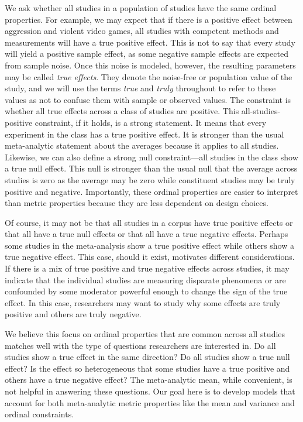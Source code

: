 \documentclass[english,man]{apa6}
\theoremstyle{definition}
\theoremstyle{definition}
\theoremstyle{remark}
\begin{document}
We ask whether all studies in a population of studies have the same
ordinal properties. For example, we may expect that if there is a
positive effect between aggression and violent video games, all studies
with competent methods and measurements will have a true positive
effect. This is not to say that every study will yield a positive sample
effect, as some negative sample effects are expected from sample noise.
Once this noise is modeled, however, the resulting parameters may be
called \emph{true effects}. They denote the noise-free or population
value of the study, and we will use the terms \emph{true} and
\emph{truly} throughout to refer to these values as not to confuse them
with sample or observed values. The constraint is whether all true
effects across a class of studies are positive. This
all-studies-positive constraint, if it holds, is a strong statement. It
means that every experiment in the class has a true positive effect. It
is stronger than the usual meta-analytic statement about the averages
because it applies to all studies. Likewise, we can also define a strong
null constraint---all studies in the class show a true null effect. This
null is stronger than the usual null that the average across studies is
zero as the average may be zero while constituent studies may be truly
positive and negative. Importantly, these ordinal properties are easier
to interpret than metric properties because they are less dependent on
design choices.

Of course, it may not be that all studies in a corpus have true positive
effects or that all have a true null effects or that all have a true
negative effects. Perhaps some studies in the meta-analysis show a true
positive effect while others show a true negative effect. This case,
should it exist, motivates different considerations. If there is a mix
of true positive and true negative effects across studies, it may
indicate that the individual studies are measuring disparate phenomena
or are confounded by some moderator powerful enough to change the sign
of the true effect. In this case, researchers may want to study why some
effects are truly positive and others are truly negative.

We believe this focus on ordinal properties that are common across all
studies matches well with the type of questions researchers are
interested in. Do all studies show a true effect in the same direction?
Do all studies show a true null effect? Is the effect so heterogeneous
that some studies have a true positive and others have a true negative
effect? The meta-analytic mean, while convenient, is not helpful in
answering these questions. Our goal here is to develop models that
account for both meta-analytic metric properties like the mean and
variance and ordinal constraints.
\end{document}
